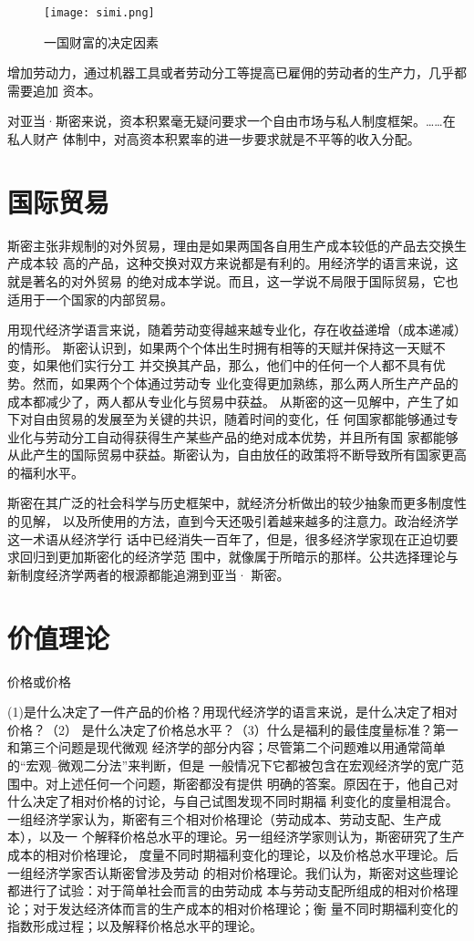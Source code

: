 \begin{figure}[ht]
  \centering
  \texttt{[image: simi.png]}
  \caption{\label{fig:simi}一国财富的决定因素 }
\end{figure}

增加劳动力，通过机器工具或者劳动分工等提高已雇佣的劳动者的生产力，几乎都需要追加
资本。

对亚当·斯密来说，资本积累毫无疑问要求一个自由市场与私人制度框架。……在私人财产
体制中，对高资本积累率的进一步要求就是不平等的收入分配。

\section{国际贸易}

斯密主张非规制的对外贸易，理由是如果两国各自用生产成本较低的产品去交换生产成本较
高的产品，这种交换对双方来说都是有利的。用经济学的语言来说，这就是著名的对外贸易
的绝对成本学说。而且，这一学说不局限于国际贸易，它也适用于一个国家的内部贸易。

用现代经济学语言来说，随着劳动变得越来越专业化，存在收益递增（成本递减）的情形。
斯密认识到，如果两个个体出生时拥有相等的天赋并保持这一天赋不变，如果他们实行分工
并交换其产品，那么，他们中的任何一个人都不具有优势。然而，如果两个个体通过劳动专
业化变得更加熟练，那么两人所生产产品的成本都减少了，两人都从专业化与贸易中获益。
从斯密的这一见解中，产生了如下对自由贸易的发展至为关键的共识，随着时间的变化，任
何国家都能够通过专业化与劳动分工自动得获得生产某些产品的绝对成本优势，并且所有国
家都能够从此产生的国际贸易中获益。斯密认为，自由放任的政策将不断导致所有国家更高
的福利水平。

斯密在其广泛的社会科学与历史框架中，就经济分析做出的较少抽象而更多制度性的见解，
以及所使用的方法，直到今天还吸引着越来越多的注意力。政治经济学这一术语从经济学行
话中已经消失一百年了，但是，很多经济学家现在正迫切要求回归到更加斯密化的经济学范
围中，就像属于所暗示的那样。公共选择理论与新制度经济学两者的根源都能追溯到亚当·
斯密。

\section{价值理论}

价格或价格

(1)是什么决定了一件产品的价格？用现代经济学的语言来说，是什么决定了相对价格？（2）
是什么决定了价格总水平？（3）什么是福利的最佳度量标准？第一和第三个问题是现代微观
经济学的部分内容；尽管第二个问题难以用通常简单的“宏观--微观二分法”来判断，但是
一般情况下它都被包含在宏观经济学的宽广范围中。对上述任何一个问题，斯密都没有提供
明确的答案。原因在于，他自己对什么决定了相对价格的讨论，与自己试图发现不同时期福
利变化的度量相混合。
一组经济学家认为，斯密有三个相对价格理论（劳动成本、劳动支配、生产成本），以及一
个解释价格总水平的理论。另一组经济学家则认为，斯密研究了生产成本的相对价格理论，
度量不同时期福利变化的理论，以及价格总水平理论。后一组经济学家否认斯密曾涉及劳动
的相对价格理论。我们认为，斯密对这些理论都进行了试验：对于简单社会而言的由劳动成
本与劳动支配所组成的相对价格理论；对于发达经济体而言的生产成本的相对价格理论；衡
量不同时期福利变化的指数形成过程；以及解释价格总水平的理论。

